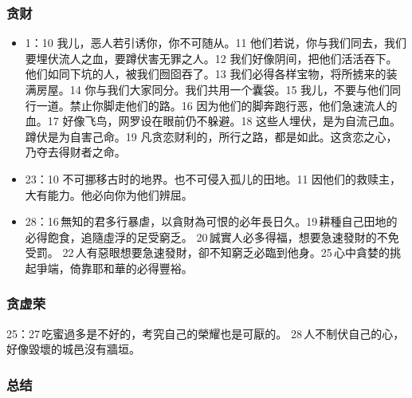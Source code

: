 \subsubsection{贪财}
\begin{itemize}
\itemsep-.45em 
\item 1：10 我儿，恶人若引诱你，你不可随从。11 他们若说，你与我们同去，我们要埋伏流人之血，要蹲伏害无罪之人。12 我们好像阴间，把他们活活吞下。他们如同下坑的人，被我们囫囵吞了。13 我们必得各样宝物，将所掳来的装满房屋。14 你与我们大家同分。我们共用一个囊袋。15 我儿，不要与他们同行一道。禁止你脚走他们的路。16 因为他们的脚奔跑行恶，他们急速流人的血。17 好像飞鸟，网罗设在眼前仍不躲避。18 这些人埋伏，是为自流己血。蹲伏是为自害己命。19 凡贪恋财利的，所行之路，都是如此。这贪恋之心，乃夺去得财者之命。
\item 23：10 不可挪移古时的地界。也不可侵入孤儿的田地。11 因他们的救赎主，大有能力。他必向你为他们辨屈。
\item 28：16 無知的君多行暴虐，以貪財為可恨的必年長日久。19 耕種自己田地的必得飽食，追隨虛浮的足受窮乏。 20 誠實人必多得福，想要急速發財的不免受罰。 22 人有惡眼想要急速發財，卻不知窮乏必臨到他身。25 心中貪婪的挑起爭端，倚靠耶和華的必得豐裕。
\end{itemize}

\subsubsection{贪虚荣}
25：27 吃蜜過多是不好的，考究自己的榮耀也是可厭的。 28 人不制伏自己的心，好像毀壞的城邑沒有牆垣。
\subsubsection{总结}



